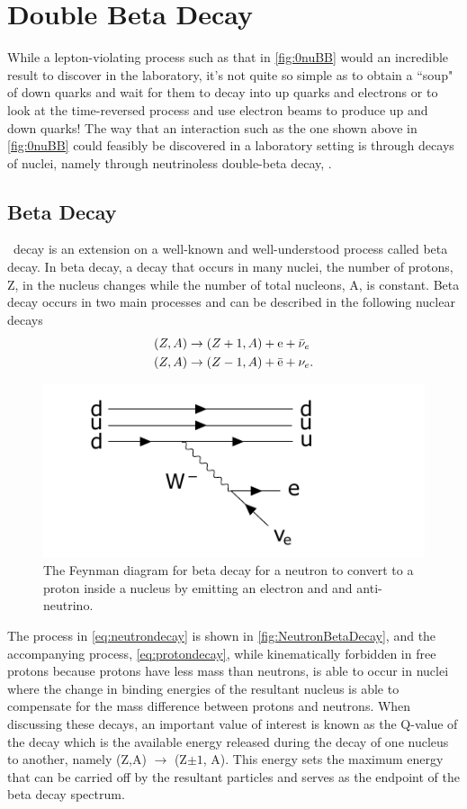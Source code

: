 \chapter{Double Beta Decay}
\label{chap:Beta Decay}

While a lepton-violating process such as that in \autoref{fig:0nuBB} would an incredible result to discover in the laboratory, it's not quite so simple as to obtain a ``soup" of down quarks and wait for them to decay into up quarks and electrons or to look at the time-reversed process and use electron beams to produce up and down quarks!
The way that an interaction such as the one shown above in \autoref{fig:0nuBB} could feasibly be discovered in a laboratory setting is through decays of nuclei, namely through neutrinoless double-beta decay, \zeronubb. 
\section{Beta Decay}
\label{sec:Beta Decay}
\zeronubb~decay is an extension on a well-known and well-understood process called beta decay. In beta decay, a decay that occurs in many nuclei, the number of protons, Z, in the nucleus changes while the number of total nucleons, A, is constant.
Beta decay occurs in two main processes and can be described in the following nuclear decays
\begin{align}
    (Z, A) & \rightarrow (Z+1, A)+\textrm{e}+\Bar{\nu}_e \label{eq:neutrondecay} \\
    (Z, A) & \rightarrow (Z-1, A)+\Bar{\textrm{e}}+\nu_e. \label{eq:protondecay}
\end{align}
\begin{figure}[tbph]
    \centering
    \includegraphics[width=0.8\linewidth]{Figures/NeutronBetaDecay.pdf}
    \caption[Beta Decay Feynman diagram for a neutron converting to a proton.]
    {The Feynman diagram for beta decay for a neutron to convert to a proton inside a nucleus by emitting an electron and and anti-neutrino.}
    \label{fig:NeutronBetaDecay}
\end{figure}
The process in \autoref{eq:neutrondecay} is shown in \autoref{fig:NeutronBetaDecay}, and the accompanying process, \autoref{eq:protondecay}, while kinematically forbidden in free protons because protons have less mass than neutrons, is able to occur in nuclei where the change in binding energies of the resultant nucleus is able to compensate for the mass difference between protons and neutrons.
When discussing these decays, an important value of interest is known as the Q-value of the decay which is the available energy released during the decay of one nucleus to another, namely (Z,A) $\rightarrow$ (Z$\pm1$, A).
This energy sets the maximum energy that can be carried off by the resultant particles and serves as the endpoint of the beta decay spectrum. 
